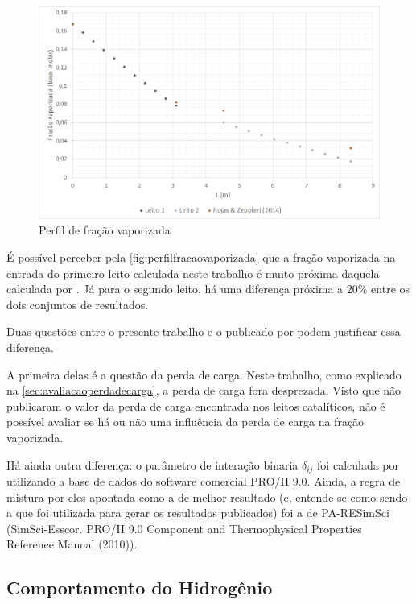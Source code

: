 \begin{figure}[htb]
\centering \includegraphics[scale=0.4]{images/Chap4/perfilfracaovaporizada.png}
\caption{Perfil de fração vaporizada}
\label{fig:perfilfracaovaporizada}
\end{figure}

É possível perceber pela \autoref{fig:perfilfracaovaporizada} que a fração
vaporizada na entrada do primeiro leito calculada neste trabalho é muito próxima
daquela calculada por . Já para o segundo leito, há uma
diferença próxima a $20 \%$ entre os dois conjuntos de resultados.

Duas questões entre o presente trabalho e o publicado por
 podem justificar essa diferença.

A primeira delas é a questão da perda de carga. Neste trabalho, como explicado
na \autoref{sec:avaliacaoperdadecarga}, a perda de carga fora desprezada. Visto
que  não publicaram o valor da perda de carga encontrada nos
leitos catalíticos, não é possível avaliar se há ou não uma influência da perda
de carga na fração vaporizada.

Há ainda outra diferença: o parâmetro de interação binaria $\delta_{ij}$ foi
calculada por  utilizando a base de dados do software
comercial PRO/II 9.0. Ainda, a regra de mistura por eles apontada como a de melhor resultado (e,
entende-se como sendo a que foi utilizada para gerar os resultados publicados)
foi a de PA-RESimSci (SimSci-Esscor. PRO/II 9.0 Component and Thermophysical
Properties Reference Manual (2010)).

\subsection{Comportamento do Hidrogênio} \label{comportamentodohidrogenio}

